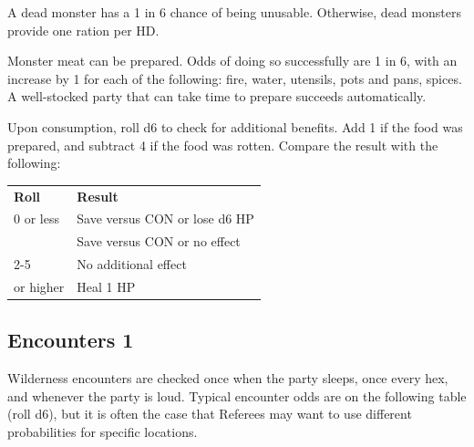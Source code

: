 \documentclass[twoside]{article}
\begin{document}
A dead monster has a 1 in 6 chance of being unusable. Otherwise, dead monsters provide one ration per HD.

\bigbreak

Monster meat can be prepared. Odds of doing so successfully are 1 in 6, with an increase by 1 for each of the following: fire, water, utensils, pots and pans, spices. A well-stocked party that can take time to prepare succeeds automatically.

\bigbreak

Upon consumption, roll d6 to check for additional benefits. Add 1 if the food was prepared, and subtract 4 if the food was rotten. Compare the result with the following:

\bigbreak

\begin{center}
\noindent\begin{tabular}{>{\centering\arraybackslash}p{}p{}}
\textbf{Roll}&\textbf{Result}\\
\rowcolor[gray]{0.75}0 or less&Save versus CON or lose d6 HP\\
1&Save versus CON or no effect\\
\rowcolor[gray]{0.75}2-5&No additional effect\\
6 or higher&Heal 1 HP\\
\end{tabular}
\end{center}

\subsection*{Encounters 1}

Wilderness encounters are checked once when the party sleeps, once every hex, and whenever the party is loud. Typical encounter odds are on the following table (roll d6), but it is often the case that Referees may want to use different probabilities for specific locations.

\bigbreak
\end{document}
